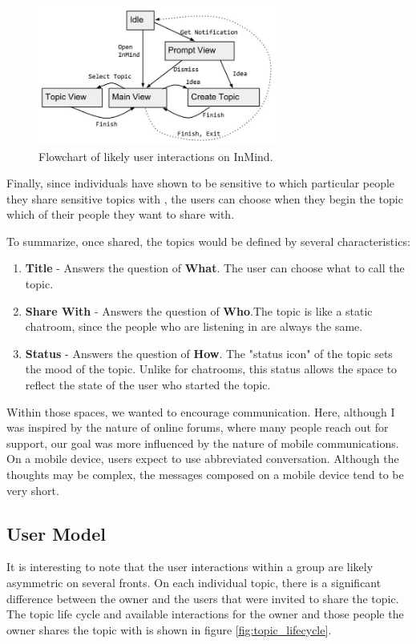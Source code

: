   \begin{figure}
  \centering
  \includegraphics[width=0.7\textwidth]{user_interaction.jpg}
  \caption{Flowchart of likely user interactions on InMind.}
  \label{fig:user_interaction}
  \end{figure}

  Finally, since individuals have shown to be sensitive
  to which particular people they share
  sensitive topics with \cite{patil05},
  the users can choose when they begin the topic
  which of their people they want to share with.

  To summarize, once shared, the topics would be defined by several characteristics:

  \begin{enumerate}
  \item \textbf{Title} - Answers the question of \textbf{What}. The user can choose what to call the topic.
  \item \textbf{Share With} - Answers the question of \textbf{Who}.The topic is like a static chatroom,
    since the people who are listening in are always the same.
  \item \textbf{Status} - Answers the question of \textbf{How}. The "status icon" of the topic sets the mood
    of the topic. Unlike for chatrooms,
    this status allows the space to reflect the state
    of the user who started the topic.
  \end{enumerate}

  Within those spaces, we wanted to encourage communication.
  Here, although I was inspired by the nature of online forums,
  where many people reach out for support,
  our goal was more influenced by the nature of mobile communications.
  On a mobile device, users expect to use abbreviated conversation.
  Although the thoughts may be complex, the messages composed on a mobile device
  tend to be very short.

    \subsection{User Model}
      It is interesting to note that the user interactions within a group
      are likely asymmetric on several fronts.
      On each individual topic, there is a significant difference between the owner
      and the users that were invited to share the topic.
      The topic life cycle and available interactions for the owner
      and those people the owner shares the topic with
      is shown in figure \ref{fig:topic_lifecycle}.

